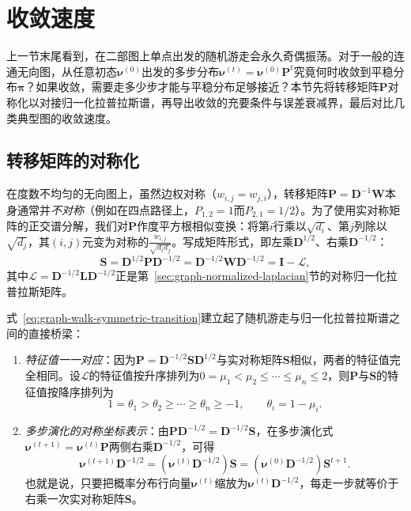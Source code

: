 \section{收敛速度}
\label{sec:graph-walk-convergence}

上一节末尾看到，在二部图上单点出发的随机游走会永久奇偶振荡。对于一般的连通无向图，从任意初态$\bm\nu^{(0)}$出发的多步分布$\bm\nu^{(t)}=\bm\nu^{(0)}\bm P^t$究竟何时收敛到平稳分布$\bm\pi$？如果收敛，需要走多少步才能与平稳分布足够接近？本节先将转移矩阵$\bm P$对称化以对接归一化拉普拉斯谱，再导出收敛的充要条件与误差衰减界，最后对比几类典型图的收敛速度。

\subsection{转移矩阵的对称化}
\label{sec:graph-walk-symmetrization}

在度数不均匀的无向图上，虽然边权对称（$w_{i,j}=w_{j,i}$），转移矩阵$\bm P=\bm D^{-1}\bm W$本身通常并\emph{不对称}（例如在四点路径上，$P_{1,2}=1$而$P_{2,1}=1/2$）。为了使用实对称矩阵的正交谱分解，我们对$\bm P$作度平方根相似变换：将第$i$行乘以$\sqrt{d_i}$、第$j$列除以$\sqrt{d_j}$，其$(i,j)$元变为对称的$\frac{w_{i,j}}{\sqrt{d_i d_j}}$。写成矩阵形式，即左乘$\bm D^{1/2}$、右乘$\bm D^{-1/2}$：
\begin{equation}
\bm{S}=\bm{D}^{1/2}\bm{P}\bm{D}^{-1/2}
=\bm{D}^{-1/2}\bm{W}\bm{D}^{-1/2}=\bm{I}-\mathcal{L},
\label{eq:graph-walk-symmetric-transition}
\end{equation}
其中$\mathcal L=\bm D^{-1/2}\bm L\bm D^{-1/2}$正是第~\ref{sec:graph-normalized-laplacian}节的对称归一化拉普拉斯矩阵。

式~\eqref{eq:graph-walk-symmetric-transition}建立起了随机游走与归一化拉普拉斯谱之间的直接桥梁：
\begin{enumerate}
\item \emph{特征值一一对应}：因为$\bm P=\bm D^{-1/2}\bm S\bm D^{1/2}$与实对称矩阵$\bm S$相似，两者的特征值完全相同。设$\mathcal L$的特征值按升序排列为$0=\mu_1<\mu_2\leq\cdots\leq\mu_n\leq 2$，则$\bm P$与$\bm S$的特征值按降序排列为
\[
  1=\theta_1>\theta_2\geq\cdots\geq\theta_n\geq -1,
  \qquad \theta_i = 1 - \mu_i.
\]
\item \emph{多步演化的对称坐标表示}：由$\bm P\bm D^{-1/2}=\bm D^{-1/2}\bm S$，在多步演化式$\bm\nu^{(t+1)}=\bm\nu^{(t)}\bm P$两侧右乘$\bm D^{-1/2}$，可得
\[
\bm{\nu}^{(t+1)}\bm{D}^{-1/2}
=(\bm{\nu}^{(t)}\bm{D}^{-1/2})\bm{S}
=(\bm{\nu}^{(0)}\bm{D}^{-1/2})\bm{S}^{t+1}.
\]
也就是说，只要把概率分布行向量$\bm\nu^{(t)}$缩放为$\bm\nu^{(t)}\bm D^{-1/2}$，每走一步就等价于右乘一次实对称矩阵$\bm S$。
\end{enumerate}

